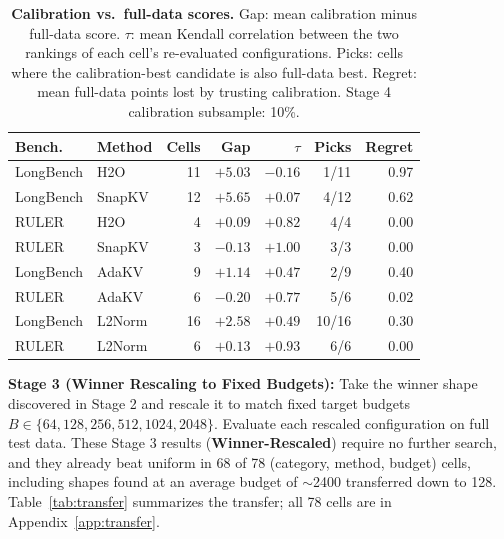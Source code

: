 \documentclass[11pt]{article}
\begin{document}
\begin{table}[htbp]
  \centering
  \footnotesize
  \setlength{\tabcolsep}{2.5pt}
  \begin{tabular}{@{} l l r r r r r @{}}
    \toprule
    \textbf{Bench.} & \textbf{Method} & \textbf{Cells} & \textbf{Gap} & \textbf{$\tau$} & \textbf{Picks} & \textbf{Regret} \\
    \midrule
    \rowcolor{gray!10}
    LongBench & H2O    & 11 & $+5.03$ & $-0.16$ & 1/11 & 0.97 \\
    LongBench & SnapKV & 12 & $+5.65$ & $+0.07$ & 4/12 & 0.62 \\
    \rowcolor{gray!10}
    RULER     & H2O    & 4  & $+0.09$ & $+0.82$ & 4/4  & 0.00 \\
    RULER     & SnapKV & 3  & $-0.13$ & $+1.00$ & 3/3  & 0.00 \\
    \midrule
    \rowcolor{gray!10}
    LongBench & AdaKV & 9 & $+1.14$ & $+0.47$ & 2/9 & 0.40 \\
    RULER     & AdaKV  & 6  & $-0.20$ & $+0.77$ & 5/6  & 0.02 \\
    \midrule
    \rowcolor{gray!10}
    LongBench & L2Norm & 16 & $+2.58$ & $+0.49$ & 10/16 & 0.30 \\
    RULER     & L2Norm & 6  & $+0.13$ & $+0.93$ & 6/6   & 0.00 \\
    \bottomrule
  \end{tabular}
  \caption{\textbf{Calibration vs.\ full-data scores.} Gap: mean calibration minus full-data score. $\tau$: mean Kendall correlation between the two rankings of each cell's re-evaluated configurations. Picks: cells where the calibration-best candidate is also full-data best. Regret: mean full-data points lost by trusting calibration. Stage 4 calibration subsample: 10\%.}
  \label{tab:calib}
\end{table}

\textbf{Stage 3 (Winner Rescaling to Fixed Budgets):} Take the winner shape discovered in Stage 2 and rescale it to match fixed target budgets $B \in \{64, 128, 256, 512, 1024, 2048\}$. Evaluate each rescaled configuration on full test data. These Stage 3 results (\textbf{Winner-Rescaled}) require no further search, and they already beat uniform in 68 of 78 (category, method, budget) cells, including shapes found at an average budget of $\sim$2400 transferred down to 128. Table~\ref{tab:transfer} summarizes the transfer; all 78 cells are in Appendix~\ref{app:transfer}.
\end{document}
